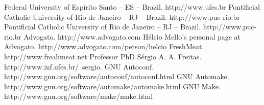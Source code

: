\documentclass[a4paper,12pt]{book}
\begin{document}
\begin{thebibliography}{9}
 Federal University of Esp\'irito Santo -- ES -- Brazil. http://www.ufes.br
 Pontificial Catholic University of Rio de Janeiro -- RJ -- Brazil. http://www.puc-rio.br
 Pontificial Catholic University of Rio de Janeiro -- RJ -- Brazil. http://www.puc-rio.br
Advogato. http://www.advogato.com
H\'elcio Mello's personal page at Advogato. http://www.advogato.com/person/helcio
FreshMeat. http://www.freahmeat.net
Professor PhD S\'ergio A. A. Freitas. http://www.inf.ufes.br/~sergio.
GNU Autoconf. http://www.gnu.org/software/autoconf/autoconf.html
GNU Automake. http://www.gnu.org/software/automake/automake.html
GNU Make. http://www.gnu.org/software/make/make.html
\end{thebibliography}
\end{document}
